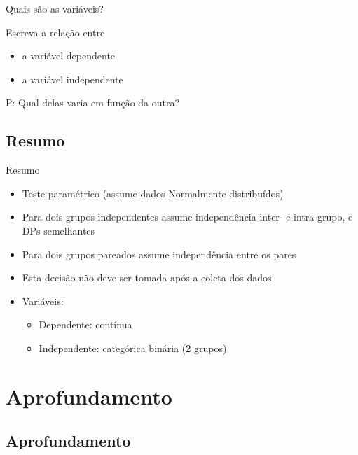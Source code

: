 \documentclass{beamer}
\begin{document}
\begin{frame}{Quais são as variáveis?}
  \begin{block}{}
    Escreva a relação entre
    \medskip
    \begin{itemize}
    \item a variável dependente
    \item a variável independente
    \end{itemize}
  \end{block}
  \bigskip
  \begin{block}{P:}
    Qual delas varia em função da outra?
  \end{block}
\end{frame}

\subsection{Resumo}

\begin{frame}{Resumo}
  \begin{itemize}
    \small
  \item Teste paramétrico (assume dados Normalmente distribuídos)
  \item Para dois grupos independentes assume independência inter- e intra-grupo, e DPs semelhantes
  \item Para dois grupos pareados assume independência entre os pares
  \item Esta decisão \alert{não} deve ser tomada após a coleta dos dados.
  \item Variáveis:
    \begin{itemize}
    \item Dependente: contínua
    \item Independente: categórica binária (2 grupos)
    \end{itemize}
  \end{itemize}
\end{frame}

\section{Aprofundamento}

\subsection{Aprofundamento}
\end{document}
